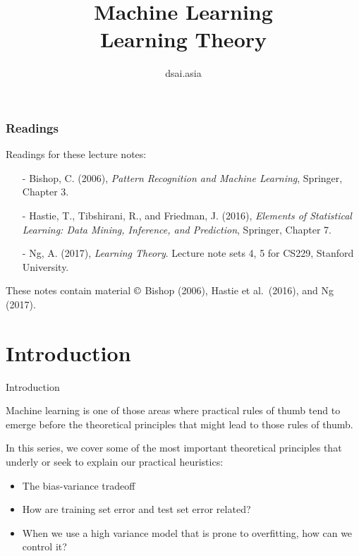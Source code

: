 \documentclass{beamer}
\title[Machine Learning]{Machine Learning\\Learning Theory}
\author{dsai.asia}
\institute[]{
  Asian Data Science and Artificial Intelligence Master's Program}
\date{}
\begin{document}


\frame{\titlepage}

%

\begin{frame}
\frametitle{Readings}

Readings for these lecture notes:
\begin{itemize}
\item[-] Bishop, C. (2006), \textit{Pattern Recognition and Machine Learning},
  Springer, Chapter 3.
\item[-] Hastie, T., Tibshirani, R., and Friedman, J. (2016),
  \textit{Elements of Statistical Learning: Data Mining, Inference, and
    Prediction}, Springer, Chapter 7.
\item[-] Ng, A. (2017), \textit{Learning Theory}.
  Lecture note sets 4, 5 for CS229, Stanford University.
\end{itemize}

These notes contain material $\copyright$ Bishop (2006), Hastie et
al.\ (2016), and Ng (2017).

\end{frame}

\section{Introduction}

\begin{frame}{Introduction}

  Machine learning is one of those areas where practical rules of
  thumb tend to emerge before the theoretical principles that might
  lead to those rules of thumb.

  \medskip

  In this series, we cover some of the most important theoretical
  principles that underly or seek to explain our practical heuristics:
  \begin{itemize}
  \item The bias-variance tradeoff
  \item How are training set error and test set error related?
  \item When we use a high variance model that is prone to
    overfitting, how can we control it?
  \end{itemize}
  
\end{frame}
\end{document}
